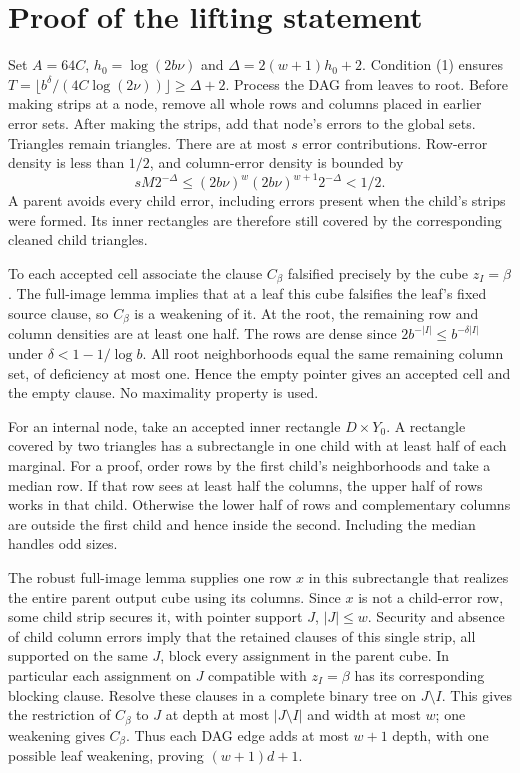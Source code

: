 \documentclass[11pt]{article}
\begin{document}
\section{Proof of the lifting statement}
Set $A=64C$, $h_0=\log(2b\nu)$ and $\Delta=2(w+1)h_0+2$.
Condition (1) ensures
$T=\lfloor b^\delta/(4C\log(2\nu))\rfloor\ge\Delta+2$.
Process the DAG from leaves to root. Before making strips at a node, remove
all whole rows and columns placed in earlier error sets. After making the
strips, add that node's errors to the global sets. Triangles remain
triangles. There are at most $s$ error contributions. Row-error density is
less than $1/2$, and column-error density is bounded by
\[
 sM2^{-\Delta}
 \le(2b\nu)^w(2b\nu)^{w+1}2^{-\Delta}<1/2.                  \tag{4}
\]
A parent avoids every child error, including errors present when the child's
strips were formed. Its inner rectangles are therefore still covered by the
corresponding cleaned child triangles.

To each accepted cell associate the clause $C_\beta$ falsified precisely by
the cube $z_I=\beta$. The full-image lemma implies that at a leaf this cube
falsifies the leaf's fixed source clause, so $C_\beta$ is a weakening of it.
At the root, the remaining row and column densities are at least one half.
The rows are dense since
$2b^{-|I|}\le b^{-\delta|I|}$ under $\delta<1-1/\log b$. All root
neighborhoods equal the same remaining column set, of deficiency at most
one. Hence the empty pointer gives an accepted cell and the empty clause.
No maximality property is used.

For an internal node, take an accepted inner rectangle $D\times Y_0$.
A rectangle covered by two triangles has a subrectangle in one child with
at least half of each marginal. For a proof, order rows by the first child's
neighborhoods and take a median row. If that row sees at least half the
columns, the upper half of rows works in that child. Otherwise the lower
half of rows and complementary columns are outside the first child and
hence inside the second. Including the median handles odd sizes.

The robust full-image lemma supplies one row $x$ in this subrectangle that
realizes the entire parent output cube using its columns. Since $x$ is not
a child-error row, some child strip secures it, with pointer support $J$,
$|J|\le w$. Security and absence of child column errors imply that the
retained clauses of this single strip, all supported on the same $J$,
block every assignment in the parent cube. In particular each assignment on
$J$ compatible with $z_I=\beta$ has its corresponding blocking clause.
Resolve these clauses in a complete binary tree on $J\setminus I$.
This gives the restriction of $C_\beta$ to $J$ at depth at most
$|J\setminus I|$ and width at most $w$; one weakening gives $C_\beta$.
Thus each DAG edge adds at most $w+1$ depth, with one possible leaf
weakening, proving $(w+1)d+1$.
\end{document}
